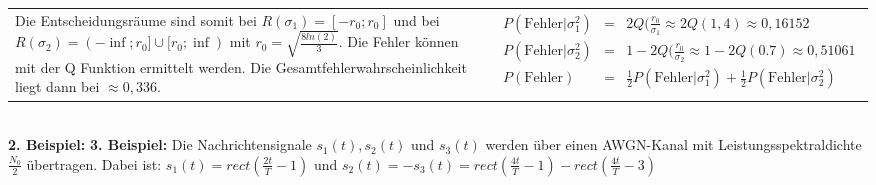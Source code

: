 \begin{tabular}{ll}
 \addtolength{\jot}{2mm}
 \parbox{5cm}{
  Die Entscheidungsräume sind somit bei $R(\sigma_1) = [-r_0;r_0]$ und bei $R(\sigma_2) = ( -\inf ; r_0] \cup [r_0 ; \inf)$ mit $r_0 = \sqrt{\frac{8 ln(2)}{3}}$. Die Fehler können mit der Q Funktion ermittelt werden. Die Gesamtfehlerwahrscheinlichkeit liegt dann bei $\approx 0,336$.}&
 \parbox{5cm}{
 \begin{eqnarray*}
 P(\text{Fehler} \vert \sigma_1^2) &=& 2Q(\frac{r_0}{\sigma_1} \approx 2Q(1,4) \approx 0,16152 \\
  P(\text{Fehler} \vert \sigma_2^2) &=& 1 - 2Q(\frac{r_0}{\sigma_2} \approx 1- 2Q(0.7) \approx 0,51061 \\
  P(\text{Fehler}) &=& \frac{1}{2} P(\text{Fehler} \vert \sigma_1^2) + \frac{1}{2} P(\text{Fehler} \vert \sigma_2^2)
 \end{eqnarray*}

}
\end{tabular}
\\
\vspace{12pt}
\textbf{2. Beispiel:}
\vfill\columnbreak
\textbf{3. Beispiel:} \quad Die Nachrichtensignale $s_1(t), s_2(t)$ und $s_3(t)$ werden über einen AWGN-Kanal mit Leistungsspektraldichte $\frac{N_0}{2}$ übertragen. Dabei ist: $s_1(t) = rect(\frac{2t}{T}-1)$ und $s_2(t) = - s_3(t) = rect(\frac{4t}{T}-1) - rect(\frac{4t}{T}-3)$\\
\vspace{6pt}
